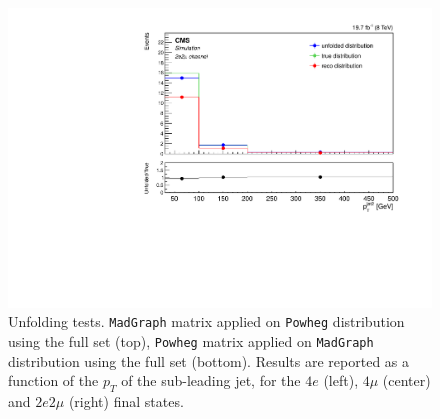 \begin{figure}[hbtp]
\begin{center}
    \includegraphics[width=0.8\cmsFigWidth]{Figures/Unfolding/MCTests/PtJet2_ZZTo2e2m_PowMatrix_MadDistr_FullSample_fr}  
 \caption{Unfolding tests. \texttt{MadGraph} matrix applied on \texttt{Powheg} distribution using the full set (top), \texttt{Powheg} matrix applied on \texttt{MadGraph} distribution using the full set (bottom). Results are reported as a function of  the $p_T$ of the sub-leading jet, for the $4e$ (left), $4\mu$ (center) and $2e2\mu$ (right) final states.}
    \label{fig:MCtest_PtJet22}
  \end{center}
\end{figure}
\clearpage
